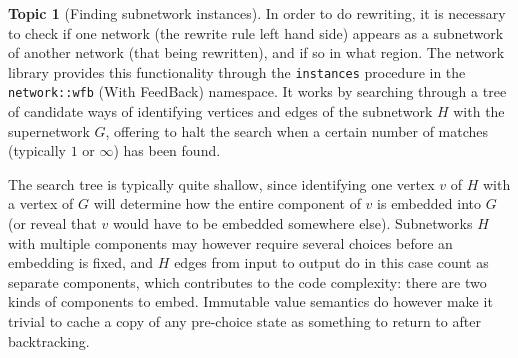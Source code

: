 \documentclass{article}
\theoremstyle{definition}
\newtheorem{topic}{Topic}
\begin{document}
\begin{topic}[Finding subnetwork instances]
  In order to do rewriting, it is necessary to check if one network 
  (the rewrite rule left hand side) appears as a subnetwork of 
  another network (that being rewritten), and if so in what region. 
  The network library provides this functionality through the 
  \texttt{instances} procedure in the \texttt{network::wfb} (With 
  FeedBack) namespace. It works by searching through a tree of 
  candidate ways of identifying vertices and edges of the subnetwork 
  $H$ with the supernetwork $G$, offering to halt the search when a 
  certain number of matches (typically $1$ or $\infty$) has been 
  found.
  
  The search tree is typically quite shallow, since identifying one 
  vertex $v$ of $H$ with a vertex of $G$ will determine how the 
  entire component of $v$ is embedded into $G$ (or reveal that $v$ 
  would have to be embedded somewhere else). Subnetworks $H$ with 
  multiple components may however require several choices before an 
  embedding is fixed, and $H$ edges from input to output do in this 
  case count as separate components, which contributes to the code 
  complexity: there are two kinds of components to embed. Immutable 
  value semantics do however make it trivial to cache a copy of any 
  pre-choice state as something to return to after backtracking.
\end{topic}
\end{document}
